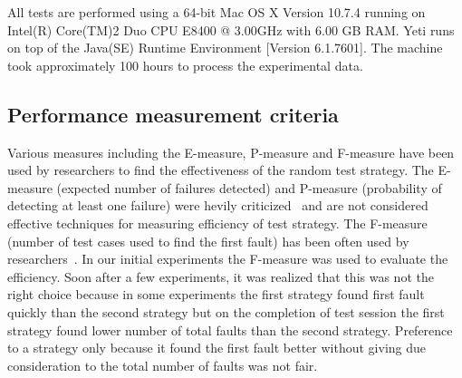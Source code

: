 \documentclass[conference]{IEEEtran}
\begin{document}
All tests are performed using a 64-bit Mac OS X Version 10.7.4 running on Intel(R) Core(TM)2 Duo CPU E8400 @ 3.00GHz with 6.00 GB RAM. Yeti runs on top of the Java(SE) Runtime Environment [Version 6.1.7601]. The machine took approximately 100 hours to process the experimental data.



\subsection{Performance measurement criteria}
Various measures including the E-measure, P-measure and F-measure have been used by researchers to find the effectiveness of the random test strategy. The E-measure (expected number of failures detected) and P-measure (probability of detecting at least one failure) were hevily criticized~\cite{Chen2008} and are not considered effective techniques for measuring efficiency of test strategy. The F-measure (number of test cases used to find the first fault) has been often used by researchers~\cite{Chen1996,Chen2004}. In our initial experiments the F-measure was used to evaluate the efficiency. Soon after a few experiments, it was realized that this was not the right choice because in some experiments the first strategy found first fault quickly than the second strategy but on the completion of test session the first strategy found lower number of total faults than the second strategy. Preference to a strategy only because it found the first fault better without giving due consideration to the total number of faults was not fair.
\end{document}
